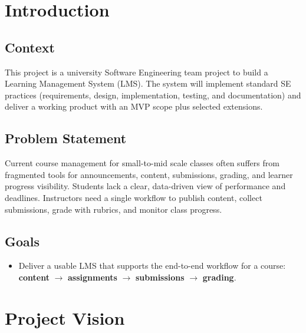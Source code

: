 \documentclass[12pt, a4paper]{article}
\begin{document}
\tableofcontents
\newpage

\section{Introduction}

\subsection{Context}
This project is a university Software Engineering team project to build a Learning
Management System (LMS). The system will implement standard SE practices
(requirements, design, implementation, testing, and documentation) and deliver a
working product with an MVP scope plus selected extensions.

\subsection{Problem Statement}
Current course management for small-to-mid scale classes often suffers from
fragmented tools for announcements, content, submissions, grading, and learner
progress visibility. Students lack a clear, data-driven view of performance and
deadlines. Instructors need a single workflow to publish content, collect
submissions, grade with rubrics, and monitor class progress.

\subsection{Goals}
\begin{itemize}
  \item Deliver a usable LMS that supports the end-to-end workflow for a course:
        \textbf{content} $\rightarrow$ \textbf{assignments} $\rightarrow$
        \textbf{submissions} $\rightarrow$ \textbf{grading}.
\end{itemize}

\section{Project Vision}
\end{document}
